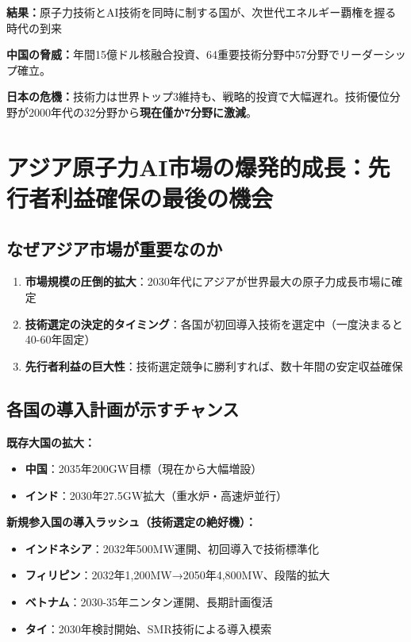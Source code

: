 \documentclass[10pt,a4paper]{jsarticle}
\begin{document}
\textbf{結果：}原子力技術とAI技術を同時に制する国が、次世代エネルギー覇権を握る時代の到来

\textbf{中国の脅威：}年間15億ドル核融合投資、64重要技術分野中57分野でリーダーシップ確立\cite{china2025}。

\textbf{日本の危機：}技術力は世界トップ3維持も、戦略的投資で大幅遅れ。技術優位分野が2000年代の32分野から\textbf{現在僅か7分野に激減}。

\section{アジア原子力AI市場の爆発的成長：先行者利益確保の最後の機会}

\subsection{なぜアジア市場が重要なのか}
\begin{enumerate}
    \item \textbf{市場規模の圧倒的拡大}：2030年代にアジアが世界最大の原子力成長市場に確定
    \item \textbf{技術選定の決定的タイミング}：各国が初回導入技術を選定中（一度決まると40-60年固定）
    \item \textbf{先行者利益の巨大性}：技術選定競争に勝利すれば、数十年間の安定収益確保
\end{enumerate}

\subsection{各国の導入計画が示すチャンス}

\textbf{既存大国の拡大：}
\begin{itemize}
    \item \textbf{中国}：2035年200GW目標（現在から大幅増設）\cite{wna2025}
    \item \textbf{インド}：2030年27.5GW拡大（重水炉・高速炉並行）\cite{efgh2025a}
\end{itemize}

\textbf{新規参入国の導入ラッシュ（技術選定の絶好機）：}
\begin{itemize}
    \item \textbf{インドネシア}：2032年500MW運開、初回導入で技術標準化\cite{efgh2025b}
    \item \textbf{フィリピン}：2032年1,200MW→2050年4,800MW、段階的拡大\cite{efgh2025c}
    \item \textbf{ベトナム}：2030-35年ニンタン運開、長期計画復活\cite{efgh2025d}
    \item \textbf{タイ}：2030年検討開始、SMR技術による導入模索
\end{itemize}
\end{document}
